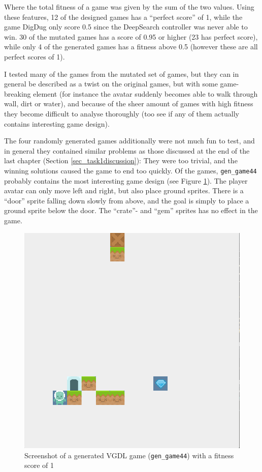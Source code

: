 \documentclass[a4paper,titlepage,final]{report}
\begin{document}
Where the total fitness of a game was given by the sum of the two values.
Using these features, 12 of the designed games has a ``perfect score'' of 1, while the game DigDug only score 0.5 since the DeepSearch controller was never able to win.
30 of the mutated games has a score of 0.95 or higher (23 has perfect score), while only 4 of the generated games has a fitness above 0.5 (however these are all perfect scores of 1).

I tested many of the games from the mutated set of games, but they can in general be described as a twist on the original games, but with some game-breaking element (for instance the avatar suddenly becomes able to walk through wall, dirt or water), and because of the sheer amount of games with high fitness they become difficult to analyse thoroughly (too see if any of them actually contains interesting game design).

The four randomly generated games additionally were not much fun to test, and in general they contained similar problems as those discussed at the end of the last chapter (Section \ref{sec_task1discussion}): They were too trivial, and the winning solutions caused the game to end too quickly.
Of the games, \texttt{gen_game44} probably contains the most interesting game design (see Figure \ref{fig:gengame44}).
The player avatar can only move left and right, but also place ground sprites. 
There is a ``door'' sprite falling down slowly from above, and the goal is simply to place a ground sprite below the door.
The ``crate''- and ``gem'' sprites has no effect in the game.

\begin{figure}[!ht]
\centering
\includegraphics[scale=0.24]{gengame44.png}
\caption{Screenshot of a generated VGDL game (\texttt{gen_game44}) with a fitness score of 1}
\label{fig:gengame44}
\end{figure}
\end{document}
